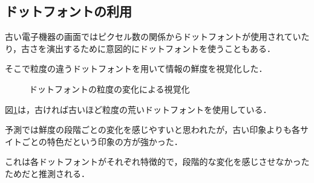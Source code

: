 \subsection{ドットフォントの利用}
\label{subsec:ver-fnt-dot}

古い電子機器の画面ではピクセル数の関係からドットフォントが使用されていたり，古さを演出するために意図的にドットフォントを使うこともある．

そこで粒度の違うドットフォントを用いて情報の鮮度を視覚化した．

\begin{figure}[htbp]
  \begin{center}
  \end{center}
  \caption{ドットフォントの粒度の変化による視覚化}
  \label{fig:ver-dot}
\end{figure}

図\ref{fig:ver-dot}は，古ければ古いほど粒度の荒いドットフォントを使用している．

予測では鮮度の段階ごとの変化を感じやすいと思われたが，古い印象よりも各サイトごとの特色だという印象の方が強かった．

これは各ドットフォントがそれぞれ特徴的で，段階的な変化を感じさせなかったためだと推測される．
